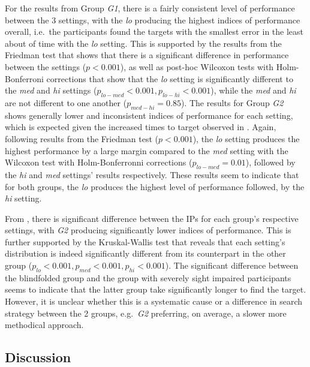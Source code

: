 \documentclass[]{interact}
\begin{document}
For the results from Group \textit{G1}, there is a fairly consistent level of performance between the 3 settings, with the \textit{lo} producing the highest indices of performance overall, i.e.\ the participants found the targets with the smallest error in the least about of time with the \textit{lo} setting.
This is supported by the results from the Friedman test that shows that there is a significant difference in performance between the settings ($p < 0.001$), as well as post-hoc Wilcoxon tests with Holm-Bonferroni corrections that show that the \textit{lo} setting is significantly different to the \textit{med} and \textit{hi} settings ($p_{lo-med} < 0.001, p_{lo-hi} < 0.001$), while the \textit{med} and \textit{hi} are not different to one another ($p_{med-hi} = 0.85$).
The results for Group \textit{G2} shows generally lower and inconsistent indices of performance for each setting, which is expected given the increased times to target observed in .
Again, following results from the Friedman test ($p < 0.001$), the \textit{lo} setting produces the highest performance by a large margin compared to the \textit{med} setting with the Wilcoxon test with Holm-Bonferronni corrections ($p_{lo-med}=0.01$), followed by the \textit{hi} and \textit{med} settings' results respectively.
These results seem to indicate that for both groups, the \textit{lo} produces the highest level of performance followed, by the \textit{hi} setting.

From , there is significant difference between the IPs for each group's respective settings, with \textit{G2} producing significantly lower indices of performance.
This is further supported by the Kruskal-Wallis test that reveals that each setting's distribution is indeed significantly different from its counterpart in the other group ($p_{lo} < 0.001, p_{med} < 0.001, p_{hi} < 0.001$).
The significant difference between the blindfolded group and the group with severely sight impaired participants seems to indicate that the latter group take significantly longer to find the target. 
However, it is unclear whether this is a systematic cause or a difference in search strategy between the 2 groups, e.g.\ \textit{G2} preferring, on average, a slower more methodical approach.

\subsection{Discussion}
\end{document}
